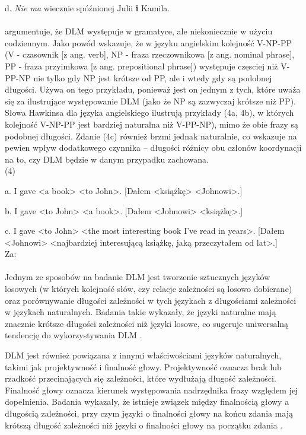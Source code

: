 \documentclass[licencjacka]{pracamgr_Kogni}
\begin{document}
d. \textit{Nie ma} wiecznie spóźnionej Julii \textbf{i} Kamila.
\\
\\
\citet{Hawkins1994} argumentuje, że DLM występuje w gramatyce, ale niekoniecznie w użyciu codziennym. Jako powód wskazuje, że w języku angielskim kolejność V-NP-PP (V - czasownik [z ang. verb], NP - fraza rzeczownikowa [z ang. nominal phrase], PP - fraza przyimkowa [z ang. prepositional phrase]) występuje częsciej niż V-PP-NP nie tylko gdy NP jest krótsze od PP, ale i wtedy gdy są podobnej długości. Używa on tego przykładu, ponieważ jest on jednym z tych, które uważa się za ilustrujące występowanie DLM (jako że NP są zazwyczaj krótsze niż PP). Słowa Hawkinsa dla języka angielskiego ilustrują przykłady (4a, 4b), w których kolejność V-NP-PP jest bardziej naturalna niż V-PP-NP), mimo że obie frazy są podobnej długości. Zdanie (4c) również brzmi jednak naturalnie, co wskazuje na pewien wpływ dodatkowego czynnika --  długości różnicy obu członów koordynacji na to, czy DLM będzie w danym przypadku zachowana.
\\

(4)

a. I gave <a book> <to John>. [Dałem <książkę> <Johnowi>.]

b. I gave <to John> <a book>. [Dałem <Johnowi> <książkę>.]

c. I gave <to John> <the most interesting book I've read in years>. [Dałem <Johnowi> <najbardziej interesującą książkę, jaką przeczytałem od lat>.]\\
Za: \citet{AnonimoweNieopublikowane}
\\
\\
Jednym ze sposobów na badanie DLM jest tworzenie sztucznych języków losowych (w których kolejność słów, czy relacje zależności są losowo dobierane) oraz porównywanie długości zależności w tych językach z długościami zależności w językach naturalnych. Badania takie wykazały, że języki naturalne mają znacznie krótsze długości zależności niż języki losowe, co sugeruje uniwersalną tendencję do wykorzystywania DLM \citep{Liu2008,Ferrer2014}. 

DLM jest również powiązana z innymi właściwościami języków naturalnych, takimi jak projektywność i finalność głowy. Projektywność oznacza brak lub rzadkość przecinających się zależności, które wydłużają długość zależności. Finalność głowy oznacza kierunek występowania nadrzędnika frazy względem jej dopełnienia. Badania wykazały, że istnieje związek między finalnością głowy a długością zależności, przy czym języki o finalności głowy na końcu zdania mają krótszą długość zależności niż języki o finalności głowy na początku zdania \citep{FutrellEtAl2015}.
\end{document}
